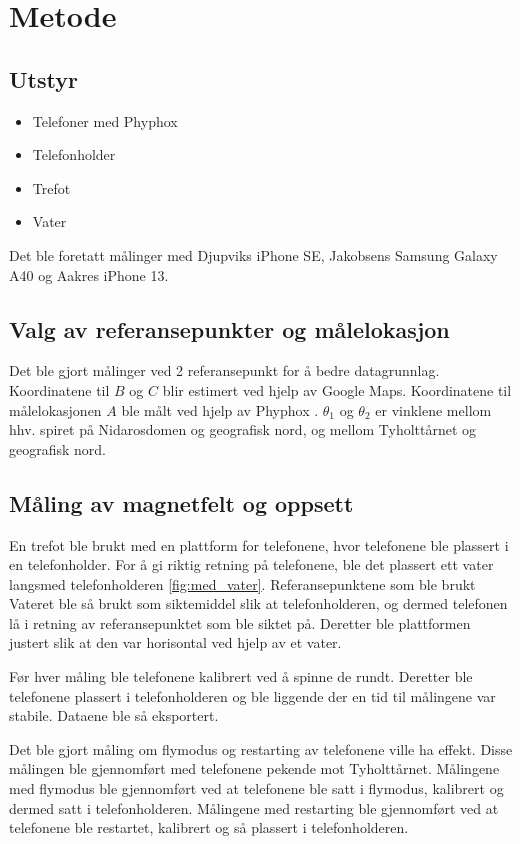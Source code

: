 \section{Metode}
\subsection{Utstyr}
\begin{itemize}
    \item Telefoner med Phyphox
    \item Telefonholder
    \item Trefot
    \item Vater
\end{itemize}
Det ble foretatt målinger med Djupviks iPhone SE, Jakobsens Samsung Galaxy A40 og Aakres iPhone 13. 

\subsection{Valg av referansepunkter og målelokasjon}
Det ble gjort målinger ved 2 referansepunkt for å bedre datagrunnlag. Koordinatene til $B$ og $C$ blir estimert ved hjelp av Google Maps. Koordinatene til målelokasjonen $A$ ble målt ved hjelp av Phyphox \cite{phyphox}. $\theta_1$ og $\theta_2$ er vinklene mellom hhv. spiret på Nidarosdomen og geografisk nord, og mellom Tyholttårnet og geografisk nord.


\subsection{Måling av magnetfelt og oppsett}
En trefot ble brukt med en plattform for telefonene, hvor telefonene ble plassert i en telefonholder. For å gi riktig retning på telefonene, ble det plassert ett vater langsmed telefonholderen \ref{fig:med_vater}. Referansepunktene som ble brukt Vateret ble så brukt som siktemiddel slik at telefonholderen, og dermed telefonen lå i retning av referansepunktet som ble siktet på. Deretter ble plattformen justert slik at den var horisontal ved hjelp av et vater.

Før hver måling ble telefonene kalibrert ved å spinne de rundt. Deretter ble telefonene plassert i telefonholderen og ble liggende der en tid til målingene var stabile. Dataene ble så eksportert. 

Det ble gjort måling om flymodus og restarting av telefonene ville ha effekt. Disse målingen ble gjennomført med telefonene pekende mot Tyholttårnet. Målingene med flymodus ble gjennomført ved at telefonene ble satt i flymodus, kalibrert og dermed satt i telefonholderen. Målingene med restarting ble gjennomført ved at telefonene ble restartet, kalibrert og så plassert i telefonholderen.

